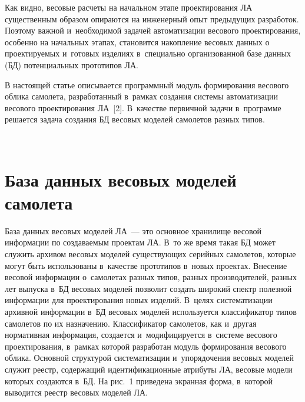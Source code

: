 \begin{multicols}{2}
  Как видно, весовые расчеты на начальном этапе проектирования ЛА 
существенным образом опираются на инженерный опыт предыдущих 
разработок. Поэтому важной и~необходимой задачей автоматизации весового 
проектирования, особенно на начальных этапах, становится накопление 
весовых данных о проектируемых и~готовых изделиях в~специально 
организованной базе данных (БД) потенциальных прототипов ЛА.
  
  В настоящей статье описывается программный модуль формирования 
весового облика самолета, разработанный в~рамках создания системы 
автоматизации весового проектирования ЛА~[2]. 
В~качестве первичной задачи в~программе решается задача создания БД 
весовых моделей самолетов разных типов. 
  
\begin{figure*} %
\vspace*{1pt}
  \begin{center}  
    \mbox{%
\epsfxsize=163mm
}

\end{center}
\vspace*{-6pt}
\vspace*{3pt}
\end{figure*}

\section{База данных весовых моделей самолета}

  База данных весовых моделей ЛА~--- это основное 
хранилище весовой информации по созда\-ва\-емым проектам ЛА. В~то же время 
такая БД может служить архивом весовых моделей существующих серийных 
самолетов, которые могут быть использованы в~качестве прототипов в~новых 
проектах. Внесение весовой информации о~самолетах разных типов, разных 
производителей, разных лет выпуска в~БД весовых моделей позволит 
создать широкий спектр полезной информации для проектирования новых 
изделий. В~целях систематизации архивной информации в~БД весовых моделей 
используется классификатор типов самолетов по их назначению. 
Классификатор самолетов, как и~другая нормативная информация, создается 
и~модифицируется в~системе весового проектирования, в~рамках которой 
разработан модуль формирования весового облика. Основной структурой 
систематизации и~упорядочения весовых моделей служит реестр, содержащий 
идентификационные атрибуты ЛА, весовые модели 
которых создаются в~БД. На рис.~1 приведена экранная форма, 
в~которой выводится реестр весовых моделей ЛА. 


\end{multicols}
